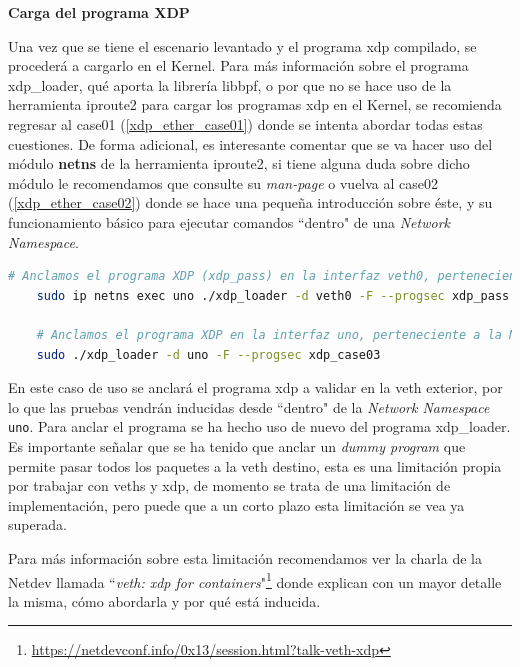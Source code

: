 \vspace{0.7cm}
\textbf{Carga del programa XDP}\\
\par
Una vez que se tiene el escenario levantado y el programa \gls{xdp} compilado, se procederá a cargarlo en el Kernel. Para más información sobre el programa xdp\_loader, qué aporta la librería libbpf, o por que no se hace uso de la herramienta iproute2 para cargar los programas \gls{xdp} en el Kernel,  se recomienda regresar al case01 (\ref{xdp_ether_case01})  donde se intenta abordar todas estas cuestiones. De forma adicional, es interesante comentar que se va hacer uso del módulo \textbf{netns} de la herramienta iproute2, si tiene alguna duda sobre dicho módulo le recomendamos que consulte su \textit{man-page} o vuelva al case02 (\ref{xdp_ether_case02}) donde se hace una pequeña introducción sobre éste, y su funcionamiento básico para ejecutar comandos ``dentro" de una \textit{Network Namespace}.

\begin{lstlisting}[language= bash, style=Consola, caption={Carga del programa XDP - Case03},label=code:case03_xdp_ether_load]
    # Anclamos el programa XDP (xdp_pass) en la interfaz veth0, perteneciente a la Network Namespace "uno" 
    sudo ip netns exec uno ./xdp_loader -d veth0 -F --progsec xdp_pass
    
    # Anclamos el programa XDP en la interfaz uno, perteneciente a la Network Namespace por defecto
    sudo ./xdp_loader -d uno -F --progsec xdp_case03
\end{lstlisting}
\vspace{0.5cm}

En este caso de uso se anclará el programa \gls{xdp} a validar en la \gls{veth} exterior, por lo que las pruebas vendrán inducidas desde ``dentro" de la \textit{Network Namespace} \texttt{uno}. Para anclar el programa se ha hecho uso de nuevo del programa xdp\_loader. Es importante señalar que se ha tenido que anclar un \textit{dummy program} que permite pasar todos los paquetes a la \gls{veth} destino, esta es una limitación propia por trabajar con \gls{veth}s y \gls{xdp}, de momento se trata de una limitación de implementación, pero puede que a un corto plazo esta limitación se vea ya superada. \\
\par
Para más información sobre esta limitación recomendamos ver la charla de la Netdev llamada ``\textit{\gls{veth}: \gls{xdp} for containers}"\footnote{\url{https://netdevconf.info/0x13/session.html?talk-veth-xdp}} donde explican con un mayor detalle la misma, cómo abordarla y por qué está inducida.

